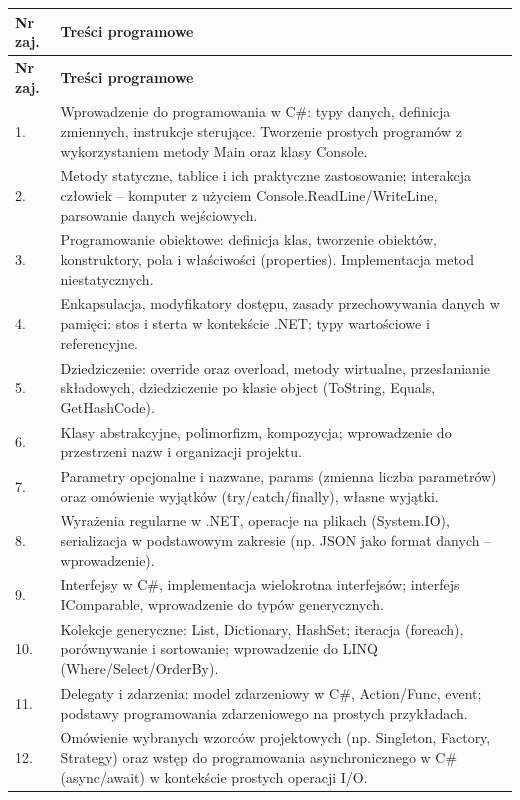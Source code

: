 \documentclass[12pt, a4paper]{article}
\newcommand{\thdrule}{\noalign{\global\setlength{\extrarowheight}{0pt}}}
\newcommand{\thdend}{\noalign{\global\setlength{\extrarowheight}{3pt}}}
\begin{document}
{\scriptsize
\begin{longtable}{m{1.5cm}m{14.5cm}}
\thdrule\toprule
\rowcolor{pjatkRed} {\color{white}\textbf{Nr zaj.}} & {\color{white}\textbf{Treści programowe}} \\
\midrule\thdend
\endfirsthead
\thdrule\toprule
\rowcolor{pjatkRed} {\color{white}\textbf{Nr zaj.}} & {\color{white}\textbf{Treści programowe}} \\
\midrule\thdend
\endhead
  \rowcolor{tableRowLight} 1. & Wprowadzenie do programowania w C\#: typy danych, definicja zmiennych, instrukcje sterujące. Tworzenie prostych programów z wykorzystaniem metody Main oraz klasy Console. \\
  \rowcolor{tableRowAlt} 2. & Metody statyczne, tablice i ich praktyczne zastosowanie; interakcja człowiek – komputer z użyciem Console.ReadLine/WriteLine, parsowanie danych wejściowych. \\
  \rowcolor{tableRowLight} 3. & Programowanie obiektowe: definicja klas, tworzenie obiektów, konstruktory, pola i właściwości (properties). Implementacja metod niestatycznych. \\
  \rowcolor{tableRowAlt} 4. & Enkapsulacja, modyfikatory dostępu, zasady przechowywania danych w pamięci: stos i sterta w kontekście .NET; typy wartościowe i referencyjne. \\
  \rowcolor{tableRowLight} 5. & Dziedziczenie: override oraz overload, metody wirtualne, przesłanianie składowych, dziedziczenie po klasie object (ToString, Equals, GetHashCode). \\
  \rowcolor{tableRowAlt} 6. & Klasy abstrakcyjne, polimorfizm, kompozycja; wprowadzenie do przestrzeni nazw i organizacji projektu. \\
  \rowcolor{tableRowLight} 7. & Parametry opcjonalne i nazwane, params (zmienna liczba parametrów) oraz omówienie wyjątków (try/catch/finally), własne wyjątki. \\
  \rowcolor{tableRowAlt} 8. & Wyrażenia regularne w .NET, operacje na plikach (System.IO), serializacja w podstawowym zakresie (np. JSON jako format danych – wprowadzenie). \\
  \rowcolor{tableRowLight} 9. & Interfejsy w C\#, implementacja wielokrotna interfejsów; interfejs IComparable, wprowadzenie do typów generycznych. \\
  \rowcolor{tableRowAlt} 10. & Kolekcje generyczne: List, Dictionary, HashSet; iteracja (foreach), porównywanie i sortowanie; wprowadzenie do LINQ (Where/Select/OrderBy). \\
  \rowcolor{tableRowLight} 11. & Delegaty i zdarzenia: model zdarzeniowy w C\#, Action/Func, event; podstawy programowania zdarzeniowego na prostych przykładach. \\
  \rowcolor{tableRowAlt} 12. & Omówienie wybranych wzorców projektowych (np. Singleton, Factory, Strategy) oraz wstęp do programowania asynchronicznego w C\# (async/await) w kontekście prostych operacji I/O. \\
\bottomrule
\end{longtable}}
\end{document}
